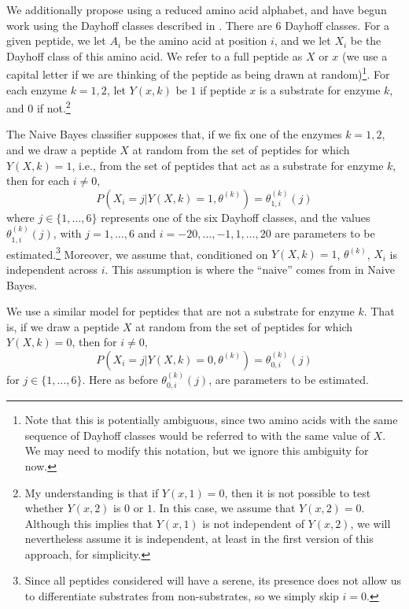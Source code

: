 \documentclass[12pt]{article}
\begin{document}
We additionally propose using a reduced amino acid alphabet, and have begun work using the Dayhoff classes described in \cite{Susko2004}.
There are 6 Dayhoff classes.  For a given peptide, we let $A_i$ be the amino acid at position $i$, and we let $X_i$ be the Dayhoff class of this amino acid.
We refer to a full peptide as $X$ or $x$ (we use a capital letter if we are thinking of the peptide as being drawn at random)\footnote{Note that this is potentially ambiguous, since two amino acids with the same sequence of Dayhoff classes would be referred to with the same value of $X$.  We may need to modify this notation, but we ignore this ambiguity for now.}.
For each enzyme $k=1,2$, let $Y(x,k)$ be $1$ if peptide $x$ is a substrate for enzyme $k$, and $0$ if not.\footnote{My understanding is that if $Y(x,1)=0$, then it is not possible to test whether $Y(x,2)$ is $0$ or $1$.  In this case, we assume that $Y(x,2)=0$.  Although this implies that $Y(x,1)$ is not independent of $Y(x,2)$, we will nevertheless assume it is independent, at least in the first version of this approach, for simplicity.}

The Naive Bayes classifier supposes that, if we fix one of the enzymes $k=1,2$, 
and we draw a peptide $X$ at random from the set of peptides for which $Y(X,k)=1$, i.e., from the set of peptides that act as a substrate for enzyme $k$, then
for each $i\ne 0$,
\begin{equation} \label{eq:NB1}
  P\left(X_i = j | Y(X,k)=1, \theta^{(k)}\right) = \theta^{(k)}_{1,i}(j)
\end{equation}
where $j\in\{1,\ldots,6\}$ represents one of the six Dayhoff classes, 
and the values $\theta^{(k)}_{1,i}(j)$, with $j=1,\ldots,6$ and $i=-20,\ldots,-1,1,\ldots,20$ are parameters to be estimated.\footnote{Since all peptides considered will have a serene, its presence does not allow us to differentiate substrates from non-substrates, so we simply skip $i=0$.}
Moreover, we assume that, conditioned on $Y(X,k)=1$, $\theta^{(k)}$, $X_i$ is independent across $i$.
This assumption is where the ``naive'' comes from in Naive Bayes.

We use a similar model for peptides that are not a substrate for enzyme $k$.
That is, 
if we draw a peptide $X$ at random from the set of peptides for which $Y(X,k)=0$, then for $i\ne 0$,
\begin{equation} \label{eq:NB0}
  P\left(X_i = j | Y(X,k)=0, \theta^{(k)}\right) = \theta^{(k)}_{0,i}(j)
\end{equation}
for $j\in\{1,\ldots,6\}$.  Here as before $\theta^{(k)}_{0,i}(j)$, are parameters to be estimated.  
\end{document}
